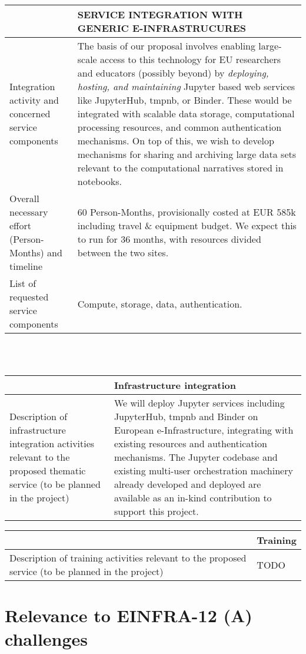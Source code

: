 \begin{tabular}{|p{7cm}|p{7cm}|}
&SERVICE INTEGRATION WITH GENERIC E-INFRASTRUCURES
\\\hline
Integration activity and concerned service components&The basis of our proposal involves
enabling large-scale access to this technology for EU researchers and educators
(possibly beyond) by \emph{deploying, hosting, and maintaining} Jupyter
based web services like JupyterHub, tmpnb, or Binder. These would be integrated
with scalable data storage, computational processing resources, and common
authentication mechanisms. On top of this, we wish to develop mechanisms for sharing
and archiving large data sets relevant to the computational narratives stored in
notebooks.
\\\hline
Overall necessary effort (Person-Months) and timeline&60 Person-Months,
provisionally costed at EUR 585k including travel \& equipment budget.
We expect this to run for 36 months, with resources divided between the two
sites.
\\\hline
List of requested service components&Compute, storage, data, authentication.
\\\hline
\end{tabular}
\\\\
\begin{tabular}{|p{7cm}|p{7cm}|}
&Infrastructure integration
\\\hline
Description of infrastructure integration activities relevant to the proposed
thematic service (to be planned in the project)&
We will deploy Jupyter services including JupyterHub, tmpnb and Binder on European
e-Infrastructure, integrating with existing resources and authentication
mechanisms. The Jupyter codebase and existing multi-user orchestration machinery
already developed and deployed are available as an in-kind contribution to
support this project.
\\\hline
\end{tabular}

\begin{tabular}{|p{7cm}|l|}
&Training
\\\hline
Description of training activities relevant to the proposed service (to be planned in the project)&TODO
\\\hline
\end{tabular}



\section{Relevance to EINFRA-12 (A) challenges}

